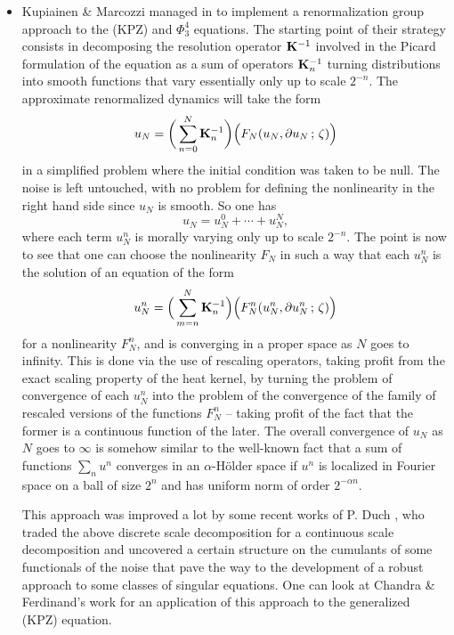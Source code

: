 \documentclass[10pt, reqno]{amsart}
\numberwithin{subsection}{section}
\numberwithin{subsubsection}{subsection}
\numberwithin{equation}{section} %
\theoremstyle{mystyle}
\theoremstyle{mystyle2}
\theoremstyle{mystyle3}
\begin{document}
{\begin{itemize}
   \item Kupiainen \& Marcozzi managed in \cite{Kupiainen1, Kupiainen2} to implement a renormalization group approach to the (KPZ) and $\Phi^4_3$ equations. The starting point of their strategy consists in decomposing the resolution operator ${\bf K}^{-1}$ involved in the Picard formulation of the equation as a sum of operators ${\bf K}^{-1}_n$ turning distributions into smooth functions that vary essentially only up to scale $2^{-n}$. The approximate renormalized dynamics will take the form
   $$
   u_N = \bigg(\sum_{n=0}^N {\bf K}^{-1}_n\bigg)\Big(F_N(u_N,\partial 
u_N\,;\,\zeta)\Big)
   $$
   in a simplified problem where the initial condition was taken to be null. The noise is left untouched, with no problem for defining the nonlinearity in the right hand side since $u_N$ is smooth. So one has
   $$
   u_N = u_N^0 + \cdots + u_N^N,
   $$
   where each term $u_N^n$ is morally varying only up to scale $2^{-n}$. The point is now to see that one can choose the nonlinearity $F_N$ in such a way that each $u_N^n$ is the solution of an equation of the form
   $$
   u_N^n = \Big(\sum_{m=n}^N {\bf K}^{-1}_n\Big)\Big(F_N^n(u_N^n,\partial u_N^n\,;\,\zeta)\Big)
   $$
   for a nonlinearity $F_N^n$, and is converging in a proper space as $N$ goes to infinity. This is done via the use of rescaling operators, taking profit from the exact scaling property of the heat kernel, by turning the problem of convergence of each $u_N^n$ into the problem of the convergence of the family of rescaled versions of the functions $F_N^n$ -- taking profit of the fact that the former is a continuous function of the later. The overall convergence of $u_N$ as $N$ goes to $\infty$ is somehow similar to the well-known fact that a sum of functions $\sum_n u^n$ converges in an $\alpha$-H\"older space if $u^n$ is localized in Fourier space on a 
ball of size $2^n$ and has uniform norm of order $2^{-\alpha n}$.

This approach was improved a lot by some recent works of P. Duch \cite{Duch1, Duch2, Duch3}, who traded the above discrete scale decomposition for a continuous scale decomposition and uncovered a certain structure on the cumulants of some functionals of the noise that pave the way to the development of a robust approach to some classes of singular equations. One can look at Chandra \& Ferdinand's work \cite{CF24} for an application of this approach to the generalized (KPZ) equation.   
\end{itemize} }

\medskip
\end{document}
